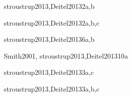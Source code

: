 \begin{syllabus}
\begin{unit}{\PLVirtualMachinesDef}{stroustrup2013,Deitel2013}{2}{a,b}
   \begin{learningoutcomes}
      \item \PLVirtualMachinesObjONE
      \item \PLVirtualMachinesObjTWO
      \item \PLVirtualMachinesObjTHREE
   \end{learningoutcomes}
\end{unit}

\begin{unit}{\PLDeclarationsAndTypesDef}{stroustrup2013,Deitel2013}{2}{a,b,c}
   \begin{topics}
      \item \PLDeclarationsAndTypesTopicThe%
      \item \PLDeclarationsAndTypesTopicDeclaration%
      \item \PLDeclarationsAndTypesTopicOverview%
   \end{topics}

   \begin{learningoutcomes}
	\item \PLDeclarationsAndTypesObjONE
	\item \PLDeclarationsAndTypesObjTWO
	\item \PLDeclarationsAndTypesObjTHREE
	\item \PLDeclarationsAndTypesObjFOUR
	\item \PLDeclarationsAndTypesObjFIVE
   \end{learningoutcomes}
\end{unit}

\begin{unit}{\PFFundamentalConstructsDef}{stroustrup2013,Deitel2013}{6}{a,b}
    \PFFundamentalConstructsAllTopics
    \PFFundamentalConstructsAllObjectives
\end{unit}

\begin{unit}{\PLObjectOrientedProgrammingDef}{Smith2001, stroustrup2013,Deitel2013}{10}{a}
   \PLObjectOrientedProgrammingAllTopics
   \PLObjectOrientedProgrammingAllObjectives
\end{unit}

\begin{unit}{\PFAlgorithmsAndProblemSolvingDef}{stroustrup2013,Deitel2013}{3}{a,c}
    \PFAlgorithmsAndProblemSolvingAllTopics
    \PFAlgorithmsAndProblemSolvingAllObjectives
\end{unit}

\begin{unit}{\PFRecursionDef}{stroustrup2013,Deitel2013}{3}{a,b,c}
    \PFRecursionAllTopics
    \PFRecursionAllObjectives
\end{unit}


\end{syllabus}
